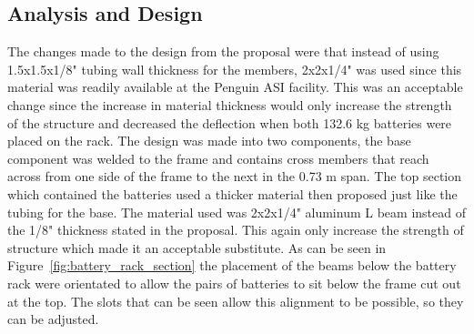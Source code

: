 \subsection{Analysis and Design}
The changes made to the design from the proposal were that instead of using 1.5x1.5x1/8" tubing wall thickness for the members, 2x2x1/4" was used since this material was readily available at the Penguin ASI facility. This was an acceptable change since the increase in material thickness would only increase the strength of the structure and decreased the deflection when both 132.6 kg batteries were placed on the rack. The design was made into two components, the base component was welded to the frame and contains cross members that reach across from one side of the frame to the next in the 0.73 m span. The top section which contained the batteries used a thicker material then proposed just like the tubing for the base. The material used was 2x2x1/4" aluminum L beam instead of the 1/8" thickness stated in the proposal. This again only increase the strength of structure which made it an acceptable substitute. As can be seen in Figure~\ref{fig:battery_rack_section} the placement of the beams below the battery rack were orientated to allow the pairs of batteries to sit below the frame cut out at the top. The slots that can be seen allow this alignment to be possible, so they can be adjusted. 



